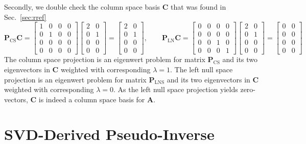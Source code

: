 \documentclass[a4paper, 11pt]{scrartcl}
\begin{document}
Secondly, we double check the column space basis $\bm{C}$ that was found in Sec.~\ref{sec:rref}
$$
\bm{P}_\text{CS} \bm{C}
=
\begin{bmatrix}
1 & 0 & 0 & 0\\
0 & 1 & 0 & 0\\
0 & 0 & 0 & 0\\
0 & 0 & 0 & 0
\end{bmatrix}
\begin{bmatrix}
2 &  0\\
0 & 1\\
0 & 0\\
0 & 0
\end{bmatrix}
=
\begin{bmatrix}
2 &  0\\
0 & 1\\
0 & 0\\
0 & 0
\end{bmatrix}
,\qquad
\bm{P}_\text{LN} \bm{C} =
\begin{bmatrix}
0 & 0 & 0 & 0\\
0 & 0 & 0 & 0\\
0 & 0 & 1 & 0\\
0 & 0 & 0 & 1
\end{bmatrix}
\begin{bmatrix}
2 & 0\\
0 & 1\\
0 & 0\\
0 & 0
\end{bmatrix}=
\begin{bmatrix}
0 & 0\\
0 & 0\\
0 & 0\\
0 & 0
\end{bmatrix}
$$
The column space projection is an eigenwert problem for matrix $\bm{P}_\text{CS}$ and its two eigenvectors in $\bm{C}$ weighted with corresponding $\lambda=1$.
The left null space projection is an eigenwert problem for matrix $\bm{P}_\text{LNS}$ and its two eigenvectors in $\bm{C}$ weighted with corresponding $\lambda=0$.
As the left null space projection yields zero-vectors, $\bm{C}$ is indeed a column space basis for $\bm{A}$.

\section{SVD-Derived Pseudo-Inverse}
\end{document}
